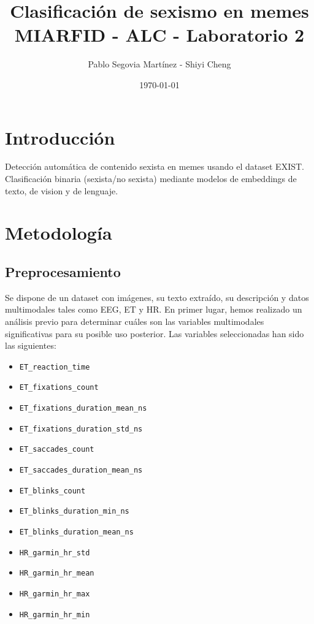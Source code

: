 \documentclass[11pt,a4paper]{article}
\title{%
    \huge Clasificación de sexismo en memes\\[0.2cm]
    \large{MIARFID - ALC - Laboratorio 2}
}
\author{Pablo Segovia Martínez - Shiyi Cheng}
\date{\today}
\begin{document}
\maketitle

\section{Introducción}

Detección automática de contenido sexista en memes usando el dataset EXIST. Clasificación binaria (sexista/no sexista) mediante modelos de embeddings de texto, de vision y de lenguaje.

\section{Metodología}

\subsection{Preprocesamiento}

    Se dispone de un dataset con imágenes, su texto extraído, su descripción y datos multimodales tales como EEG, ET y HR. En primer lugar, hemos realizado un análisis previo para determinar cuáles son las variables multimodales significativas para su posible uso posterior. Las variables seleccionadas han sido las siguientes:
    \begin{itemize}\setlength{\itemsep}{0pt}\setlength{\parskip}{0pt}\setlength{\topsep}{2pt}
    	\item \texttt{ET\_reaction\_time}
    	\item \texttt{ET\_fixations\_count}
    	\item \texttt{ET\_fixations\_duration\_mean\_ns}
    	\item \texttt{ET\_fixations\_duration\_std\_ns}
    	\item \texttt{ET\_saccades\_count}
    	\item \texttt{ET\_saccades\_duration\_mean\_ns}
    	\item \texttt{ET\_blinks\_count}
    	\item \texttt{ET\_blinks\_duration\_min\_ns}
    	\item \texttt{ET\_blinks\_duration\_mean\_ns}
    	\item \texttt{HR\_garmin\_hr\_std}
    	\item \texttt{HR\_garmin\_hr\_mean}
    	\item \texttt{HR\_garmin\_hr\_max}
    	\item \texttt{HR\_garmin\_hr\_min}
    \end{itemize}
    
\end{document}
